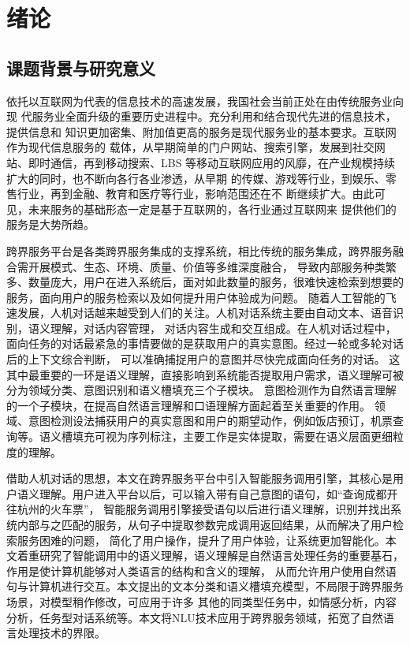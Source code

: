 \chapter{绪论}

\section{课题背景与研究意义}

依托以互联网为代表的信息技术的高速发展，我国社会当前正处在由传统服务业向现
代服务业全面升级的重要历史进程中。充分利用和结合现代先进的信息技术，提供信息和
知识更加密集、附加值更高的服务是现代服务业的基本要求。互联网作为现代信息服务的
载体，从早期简单的门户网站、搜索引擎，发展到社交网站、即时通信\cite{王晓玲2015我国现代服务业借力}，再到移动搜索、LBS
等移动互联网应用的风靡，在产业规模持续扩大的同时，也不断向各行各业渗透，从早期
的传媒、游戏等行业，到娱乐、零售行业，再到金融、教育和医疗等行业，影响范围还在不
断继续扩大\cite{王晓玲2015我国现代服务业借力}。由此可见，未来服务的基础形态一定是基于互联网的，各行业通过互联网来
提供他们的服务是大势所趋。


跨界服务平台是各类跨界服务集成的支撑系统，相比传统的服务集成，跨界服务融合需开展模式、生态、环境、质量、价值等多维深度融合，
导致内部服务种类繁多、数量庞大，用户在进入系统后，面对如此数量的服务，很难快速检索到想要的服务，面向用户的服务检索以及如何提升用户体验成为问题。
随着人工智能的飞速发展，人机对话越来越受到人们的关注。人机对话系统主要由自动文本、语音识别，语义理解，对话内容管理，
对话内容生成和交互组成。在人机对话过程中，面向任务的对话最紧急的事情要做的是获取用户的真实意图。经过一轮或多轮对话后的上下文综合判断，
可以准确捕捉用户的意图并尽快完成面向任务的对话。
这其中最重要的一环是语义理解，直接影响到系统能否提取用户需求，语义理解可被分为领域分类、意图识别和语义槽填充三个子模块。
意图检测作为自然语言理解的一个子模块，在提高自然语言理解和口语理解方面起着至关重要的作用。
领域、意图检测设法捕获用户的真实意图和用户的期望动作，例如饭店预订，机票查询等。语义槽填充可视为序列标注，主要工作是实体提取，需要在语义层面更细粒度的理解。

借助人机对话的思想，本文在跨界服务平台中引入智能服务调用引擎，其核心是用户语义理解。用户进入平台以后，可以输入带有自己意图的语句，如“查询成都开往杭州的火车票”，
智能服务调用引擎接受语句以后进行语义理解，识别并找出系统内部与之匹配的服务，从句子中提取参数完成调用返回结果，从而解决了用户检索服务困难的问题，
简化了用户操作，提升了用户体验，让系统更加智能化。本文着重研究了智能调用中的语义理解，语义理解是自然语言处理任务的重要基石，作用是使计算机能够对人类语言的结构和含义的理解，
从而允许用户使用自然语句与计算机进行交互。本文提出的文本分类和语义槽填充模型，不局限于跨界服务场景，对模型稍作修改，可应用于许多
其他的同类型任务中，如情感分析，内容分析，任务型对话系统等。本文将NLU技术应用于跨界服务领域，拓宽了自然语言处理技术的界限。

